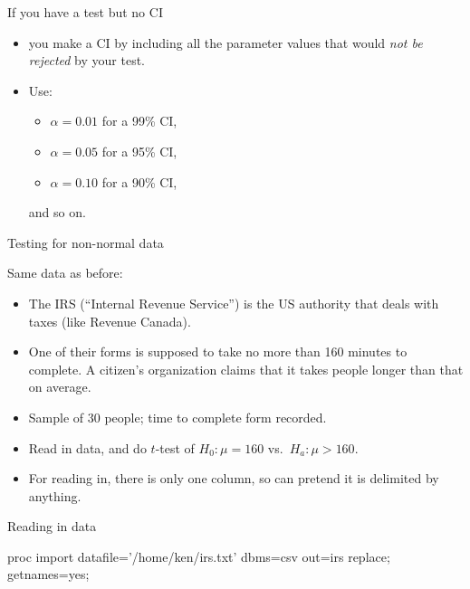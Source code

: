 \documentclass[unknownkeysallowed]{beamer}\usepackage[]{graphicx}\usepackage[]{color}
\begin{document}
\begin{frame}[fragile]{If you have a test but no CI}

  \begin{itemize}
  \item you make a CI by including all the parameter values that would
    \emph{not be rejected} by your test.
  \item Use:
    \begin{itemize}
    \item $\alpha=0.01$ for a 99\% CI,
    \item     $\alpha=0.05$ for a 95\% CI,
    \item  $\alpha=0.10$ for a 90\% CI, 
    \end{itemize}
    and so on.
  \end{itemize}
  
\end{frame}


\begin{frame}[fragile]{Testing for non-normal data}
  
  Same data as before:
  
  \begin{itemize}
  \item The IRS (``Internal Revenue Service'') is the US authority
    that deals with taxes (like Revenue Canada). 
  \item One of their forms is supposed to take no more than 160
    minutes to complete. A citizen's organization claims that it takes
    people longer than that on average.
  \item Sample of 30 people; time to complete form recorded.
  \item Read in data, and do $t$-test of $H_0: \mu=160$ vs.\
    $H_a: \mu>160$.
  \item For reading in, there is only one column, so can pretend it is
    delimited by anything.
  \end{itemize}
  
\end{frame}

\begin{frame}[fragile]{Reading in data}
  
  \begin{Datastep}
proc import
  datafile='/home/ken/irs.txt'
    dbms=csv
    out=irs
    replace;
  getnames=yes;
  \end{Datastep}
  
\end{frame}
\end{document}
